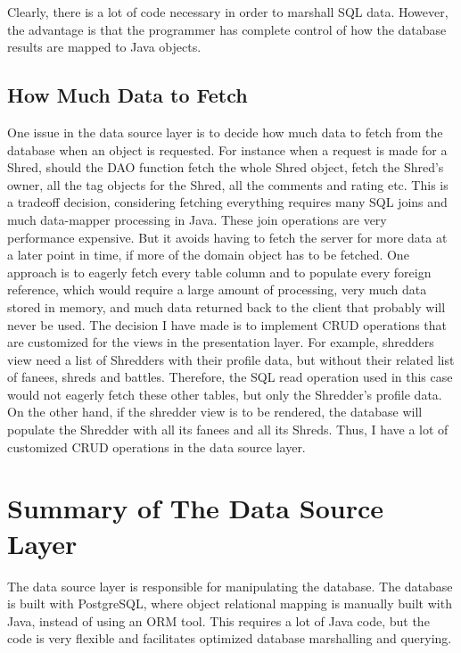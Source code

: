 Clearly, there is a lot of code necessary in order to marshall SQL data. However, the advantage is that the programmer has complete control of how the database results are mapped to Java objects. 

	
\subsection{How Much Data to Fetch}
One issue in the data source layer is to decide how much data to fetch from the database when an object is requested. For instance when a request is made for a Shred, should the DAO function fetch the whole Shred object, fetch the Shred's owner, all the tag objects for the Shred, all the comments and rating etc. This is a tradeoff decision, considering fetching everything requires many SQL joins and much data-mapper processing in Java. These join operations are very performance expensive. But it avoids having to fetch the server for more data at a later point in time, if more of the domain object has to be fetched. One approach is to eagerly fetch every table column and to populate every foreign reference, which would require a large amount of processing, very much data stored in memory, and much data returned back to the client that probably will never be used. The decision I have made is to implement CRUD operations that are customized for the views in the presentation layer. For example, shredders view need a list of Shredders with their profile data, but without their related list of fanees, shreds and battles. Therefore, the SQL read operation used in this case would not eagerly fetch these other tables, but only the Shredder's profile data. On the other hand, if the shredder view is to be rendered, the database will populate the Shredder with all its fanees and all its Shreds. Thus, I have a lot of customized CRUD operations in the data source layer.		

\section{Summary of The Data Source Layer }
The data source layer is responsible for manipulating the database. The database is built with PostgreSQL, where object relational mapping is manually built with Java, instead of using an ORM tool. This requires a lot of Java code, but the code is very flexible and facilitates optimized database marshalling and querying.

